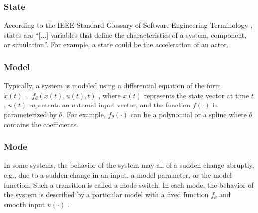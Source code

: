 \subsubsection{State}
\label{sec:state}
According to the IEEE Standard Glossary of Software Engineering Terminology \cite{ieee1990glossary}, states are ``[...] variables that define the characteristics of a system, component, or simulation''. For example, a state could be the acceleration of an actor.

\subsubsection{Model}
\label{sec:model}
Typically, a system is modeled using a differential equation of the form $\dot{x}(t)=f_{\theta}(x(t), u(t), t)$ \cite{norman2011control}, where $x(t)$ represents the state vector at time $t$, $u(t)$ represents an external input vector, and the function $f(\cdot)$ is parameterized by $\theta$. For example, $f_{\theta}(\cdot)$ can be a polynomial or a spline where $\theta$ contains the coefficients.

\subsubsection{Mode}
\label{sec:mode}
In some systems, the behavior of the system may all of a sudden change abruptly, e.g., due to a sudden change in an input, a model parameter, or the model function. Such a transition is called a mode switch.
In each mode, the behavior of the system is described by a particular model with a fixed function $f_{\theta}$ and smooth input $u(\cdot)$ \cite{deschutter2000optimal}.


